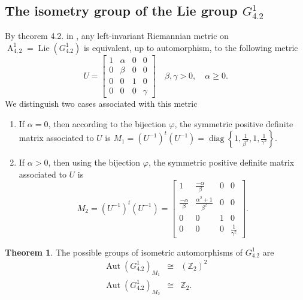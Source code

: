 \documentclass[12pt,a4paper,twoside]{article}
\theoremstyle{definition}
\newtheorem{theorem}{Theorem}[section]
\begin{document}
\subsection{The isometry group of the Lie group $G_{4.2}^{1}$}
By theorem 4.2. in \cite{aitbenhaddou2025classification}, any left-invariant Riemannian metric on $\operatorname{A}_{4, 2}^{1} = \operatorname{Lie}(G_{4.2}^{1})$ is equivalent, up to automorphism, to the following metric
$$U = \begin{bmatrix}
1 & \alpha & 0 & 0\\
0 & \beta & 0 & 0\\
0 & 0 & 1 & 0\\
0 & 0 & 0 & \gamma
\end{bmatrix} \quad \beta, \gamma > 0, \quad \alpha \geq 0.$$
We distinguish two cases associated with this metric
\begin{enumerate}
\item If $\alpha = 0$, then according to the bijection $\varphi$, the symmetric positive definite matrix associated to $U$ is $M_1 = (U^{-1})^t(U^{-1}) = \operatorname{diag}\left\lbrace 1, \frac{1}{\beta^2}, 1, \frac{1}{\gamma^2}\right\rbrace$.
\item If $\alpha > 0$, then using the bijection $\varphi$, the symmetric positive definite matrix associated to $U$ is
$$M_2 = (U^{-1})^t(U^{-1}) = \begin{bmatrix}
1 & \frac{-\alpha}{\beta} & 0 & 0\\
\frac{-\alpha}{\beta} & \frac{\alpha^2 + 1}{\beta^2} & 0 & 0\\
0 & 0 & 1 & 0\\
0 & 0 & 0 & \frac{1}{\gamma^2}
\end{bmatrix}.$$
\end{enumerate}
\begin{theorem} 
The possible groups of isometric automorphisms of $G_{4.2}^{1}$ are
\begin{eqnarray*}
\operatorname{Aut}\left(G_{4.2}^{1}\right)_{M_1}  &\cong& \left(\mathbb{Z}_2\right)^2\\
\operatorname{Aut}\left(G_{4.2}^{1}\right)_{M_2}  &\cong& \mathbb{Z}_2.
\end{eqnarray*}
\end{theorem}
\end{document}
